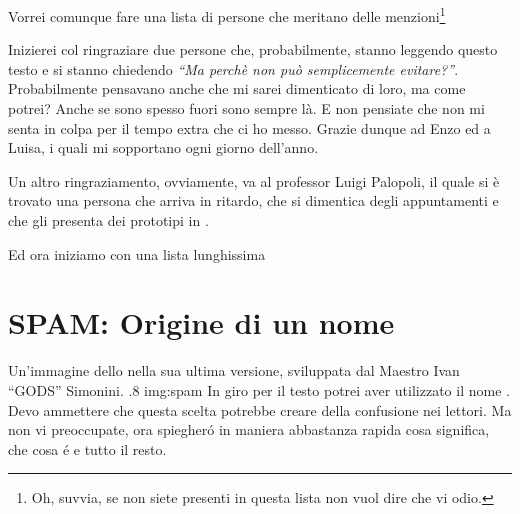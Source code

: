 Vorrei comunque fare una lista di persone che meritano delle
menzioni\footnote{Oh, suvvia, se non siete presenti in questa lista non
vuol dire che vi odio.}

Inizierei col ringraziare due persone che, probabilmente, stanno leggendo
questo testo e si stanno chiedendo \emph{``Ma perchè non può semplicemente
evitare?''}. Probabilmente pensavano anche che mi sarei dimenticato di
loro, ma come potrei? Anche se sono spesso fuori sono sempre là. E non
pensiate che non mi senta in colpa per il tempo extra che ci ho messo.
Grazie dunque ad Enzo ed a Luisa, i quali mi sopportano ogni giorno
dell'anno.

Un altro ringraziamento, ovviamente, va al professor Luigi Palopoli, il
quale si è trovato una persona che arriva in ritardo, che si dimentica
degli appuntamenti e che gli presenta dei prototipi in .

Ed ora iniziamo con una lista lunghissima 

\section*{SPAM: Origine di un nome}
        {Un'immagine dello \SPAM{} nella sua ultima versione,
            sviluppata dal Maestro Ivan ``GODS'' Simonini.}
        {.8}
        {img:spam}
In giro per il testo potrei aver utilizzato il nome \SPAM{}. Devo ammettere
che questa scelta potrebbe creare della confusione nei lettori. Ma non vi
preoccupate, ora spiegher\'o in maniera abbastanza rapida cosa significa,
che cosa \'e e tutto il resto.

\cleardoublepage
